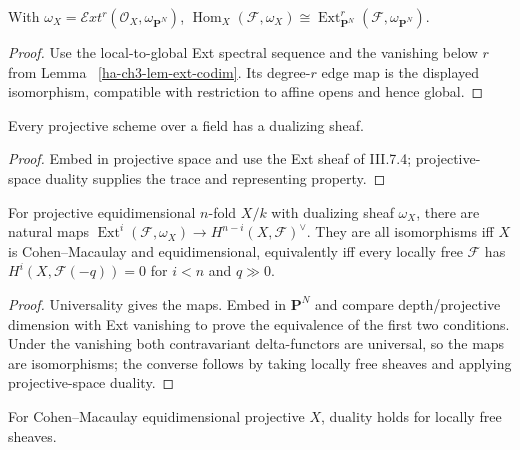 \begin{lemma}\label{ha-ch3-lem-dualizing-ext}
With $\omega_X=\mathcal E xt^r(\mathcal O_X,\omega_{\mathbf P^N})$,
$\operatorname{Hom}_X(\mathcal F,\omega_X)\cong
\operatorname{Ext}_{\mathbf P^N}^r(\mathcal F,\omega_{\mathbf P^N})$.
\end{lemma}
\begin{proof}

Use the local-to-global Ext spectral sequence and the vanishing below $r$ from Lemma
~\ref{ha-ch3-lem-ext-codim}.  Its degree-$r$ edge map is the displayed isomorphism, compatible
with restriction to affine opens and hence global.

\end{proof}
\begin{proposition}\label{ha-ch3-prop-dualizing-existence}
Every projective scheme over a field has a dualizing sheaf.

\end{proposition}
\begin{proof}
Embed in projective space and use the Ext sheaf of III.7.4;
projective-space duality supplies the trace and representing property.
\end{proof}
\begin{theorem}\label{ha-ch3-thm-duality-projective-scheme}
For projective equidimensional $n$-fold $X/k$ with dualizing sheaf $\omega_X$,
there are natural maps $\operatorname{Ext}^i(\mathcal F,\omega_X)\to
H^{n-i}(X,\mathcal F)^\vee$.  They are all isomorphisms iff $X$ is
Cohen--Macaulay and equidimensional, equivalently iff every locally free
$\mathcal F$ has $H^i(X,\mathcal F(-q))=0$ for $i<n$ and $q\gg0$.

\end{theorem}
\begin{proof}
Universality gives the maps.  Embed in $\mathbf P^N$ and compare
depth/projective dimension with Ext vanishing to prove the equivalence of the
first two conditions.  Under the vanishing both contravariant delta-functors
are universal, so the maps are isomorphisms; the converse follows by taking
locally free sheaves and applying projective-space duality.
\end{proof}
\begin{corollary}\label{ha-ch3-cor-duality-cm}
For Cohen--Macaulay equidimensional projective $X$, duality holds for locally
free sheaves.
\end{corollary}
